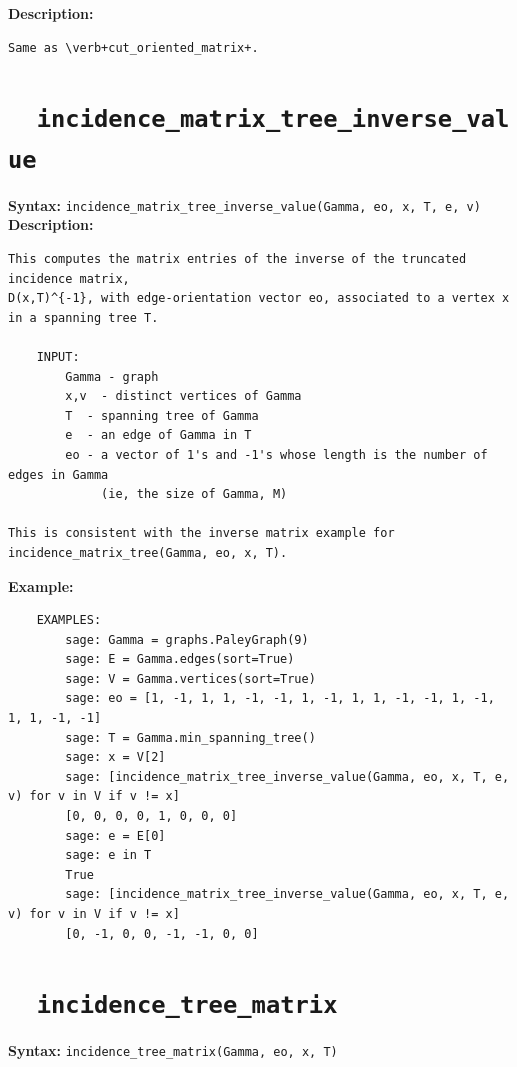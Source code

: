 \documentclass{article}
\begin{document}
\textbf{Description:}
\begin{verbatim}
Same as \verb+cut_oriented_matrix+.
\end{verbatim}


\section{\tt \ \ incidence\_matrix\_tree\_inverse\_value}

\textbf{Syntax:} \verb}incidence_matrix_tree_inverse_value(Gamma, eo, x, T, e, v)}\\

\textbf{Description:}
\begin{verbatim}
This computes the matrix entries of the inverse of the truncated incidence matrix, 
D(x,T)^{-1}, with edge-orientation vector eo, associated to a vertex x in a spanning tree T.

    INPUT:
        Gamma - graph
        x,v  - distinct vertices of Gamma
        T  - spanning tree of Gamma  
        e  - an edge of Gamma in T
        eo - a vector of 1's and -1's whose length is the number of edges in Gamma
             (ie, the size of Gamma, M)

This is consistent with the inverse matrix example for incidence_matrix_tree(Gamma, eo, x, T).
\end{verbatim}

\textbf{Example:}
\begin{verbatim}
    EXAMPLES:
        sage: Gamma = graphs.PaleyGraph(9)
        sage: E = Gamma.edges(sort=True)
        sage: V = Gamma.vertices(sort=True)
        sage: eo = [1, -1, 1, 1, -1, -1, 1, -1, 1, 1, -1, -1, 1, -1, 1, 1, -1, -1]
        sage: T = Gamma.min_spanning_tree()
        sage: x = V[2]
        sage: [incidence_matrix_tree_inverse_value(Gamma, eo, x, T, e, v) for v in V if v != x]
        [0, 0, 0, 0, 1, 0, 0, 0]
        sage: e = E[0]
        sage: e in T
        True
        sage: [incidence_matrix_tree_inverse_value(Gamma, eo, x, T, e, v) for v in V if v != x]
        [0, -1, 0, 0, -1, -1, 0, 0]

\end{verbatim}

\section{\tt \ \ incidence\_tree\_matrix}

\textbf{Syntax:} \verb}incidence_tree_matrix(Gamma, eo, x, T)}\\
\end{document}
